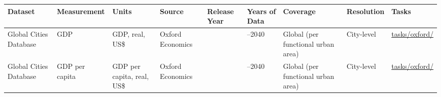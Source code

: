 \documentclass[
  letterpaper,
  DIV=11,
  numbers=noendperiod]{scrreprt}
\newcounter{none} %
\begin{document}
{\def\LTcaptype{none} %
\begin{longtable}[]{@{}
  >{\raggedright\arraybackslash}p{}
  >{\raggedright\arraybackslash}p{}
  >{\raggedright\arraybackslash}p{}
  >{\raggedright\arraybackslash}p{}
  >{\raggedright\arraybackslash}p{}
  >{\raggedright\arraybackslash}p{}
  >{\raggedright\arraybackslash}p{}
  >{\raggedright\arraybackslash}p{}
  >{\raggedright\arraybackslash}p{}@{}}
\toprule\noalign{}
\begin{minipage}[b]{\linewidth}\raggedright
Dataset
\end{minipage} & \begin{minipage}[b]{\linewidth}\raggedright
Measurement
\end{minipage} & \begin{minipage}[b]{\linewidth}\raggedright
Units
\end{minipage} & \begin{minipage}[b]{\linewidth}\raggedright
Source
\end{minipage} & \begin{minipage}[b]{\linewidth}\raggedright
Release Year
\end{minipage} & \begin{minipage}[b]{\linewidth}\raggedright
Years of Data
\end{minipage} & \begin{minipage}[b]{\linewidth}\raggedright
Coverage
\end{minipage} & \begin{minipage}[b]{\linewidth}\raggedright
Resolution
\end{minipage} & \begin{minipage}[b]{\linewidth}\raggedright
Tasks
\end{minipage} \\
\midrule\noalign{}
\endhead
\bottomrule\noalign{}
\endlastfoot
Global Cities Database & GDP & GDP, real, US\$ & Oxford Economics & 2022
& 2000--2040 & Global (per functional urban area) & City-level &
\href{../tasks/oxford/}{tasks/oxford/} \\
Global Cities Database & GDP per capita & GDP per capita, real, US\$ &
Oxford Economics & 2022 & 2000--2040 & Global (per functional urban
area) & City-level & \href{../tasks/oxford/}{tasks/oxford/} \\
\end{longtable}
}
\end{document}
